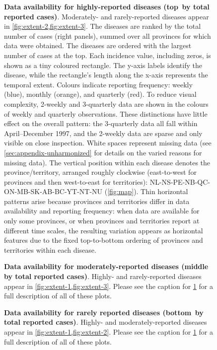 \documentclass[12pt]{article}
\begin{document}
\begin{figure}[!htb]
\caption{\textbf{Data availability for highly-reported diseases (top \protect\,by total reported cases)}. Moderately- and rarely-reported diseases appear in \cref{fig:extent-2,fig:extent-3}. The diseases are ranked by the total number of cases (right panels), summed over all provinces for which data were obtained. The diseases are ordered with the largest number of cases at the top. Each incidence value, including zeros, is shown as a tiny coloured rectangle. The y-axis labels identify the disease, while the rectangle's length along the x-axis represents the temporal extent. Colours indicate reporting frequency: weekly (blue), monthly (orange), and quarterly (red). To reduce visual complexity, 2-weekly and 3-quarterly data are shown in the colours of weekly and quarterly observations. These distinctions have little effect on the overall pattern: the 3-quarterly data all fall within April–December 1997, and the 2-weekly data are sparse and only visible on close inspection. White spaces represent missing data (see \cref{sec:appendix-unharmonized} for details on the varied reasons for missing data). The vertical position within each disease denotes the province/territory, arranged roughly clockwise (east-to-west for provinces and then west-to-east for territories): NL-NS-PE-NB-QC-ON-MB-SK-AB-BC-YT-NT-NU (\cref{fig:map}). Thin horizontal patterns arise because provinces and territories differ in data availability and reporting frequency: when data are available for only some provinces, or when provinces and territories report at different time scales, the resulting variation appears as horizontal features due to the fixed top-to-bottom ordering of provinces and territories within each disease.}\label{fig:extent-1}
\end{figure}

\begin{figure}[!htb]
\caption{\textbf{Data availability for moderately-reported diseases (middle \protect\,by total reported cases)}. Highly- and rarely-reported diseases appear in \cref{fig:extent-1,fig:extent-3}. Please see the caption for \cref{fig:extent-1} for a full description of all of these plots.}\label{fig:extent-2}
\end{figure}

\begin{figure}[!htb]
\caption{\textbf{Data availability for rarely reported diseases (bottom \protect\,by total reported cases)}. Highly- and moderately-reported diseases appear in \cref{fig:extent-1,fig:extent-2}. Please see the caption for \cref{fig:extent-1} for a full description of all of these plots.}\label{fig:extent-3}
\end{figure}
\end{document}
